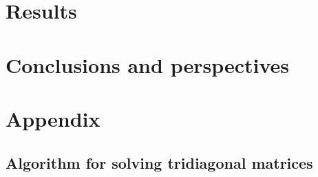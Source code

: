 \documentclass[12pt,a4paper]{article}
\begin{document}
\section{Results}

\section{Conclusions and perspectives}

\clearpage
\appendix
\section{Appendix}

\subsection{Algorithm for solving tridiagonal matrices}
\label{apx:b}



\clearpage

\printbibliography[heading=bibnumbered,title=Bibliography]
\end{document}
